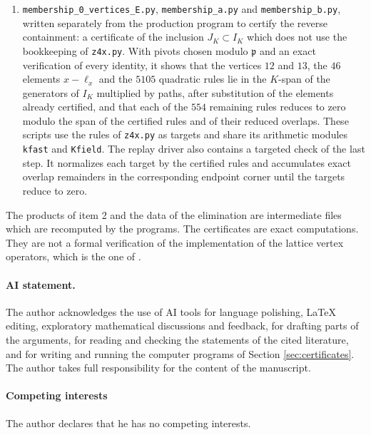 \documentclass[leqno]{article}
\numberwithin{equation}{section}
\begin{document}
\begin{enumerate}
\item \texttt{membership\_0\_vertices\_E.py}, \texttt{membership\_a.py} and \texttt{membership\_b.py}, written separately from the production program to certify the reverse containment: a certificate of the inclusion $J_K \subset I_K$ which does not use the bookkeeping of \texttt{z4x.py}. With pivots chosen modulo $\mathfrak p$ and an exact verification of every identity, it shows that the vertices $12$ and $13$, the $46$ elements $x - \ell_x$ and the $5105$ quadratic rules lie in the $K$-span of the generators of $I_K$ multiplied by paths, after substitution of the elements already certified, and that each of the $554$ remaining rules reduces to zero modulo the span of the certified rules and of their reduced overlaps. These scripts use the rules of \texttt{z4x.py} as targets and share its arithmetic modules \texttt{kfast} and \texttt{Kfield}. The replay driver also contains a targeted check of the last step. It normalizes each target by the certified rules and accumulates exact overlap remainders in the corresponding endpoint corner until the targets reduce to zero.
\end{enumerate}
The products of item 2 and the data of the elimination are intermediate files which are recomputed by the programs. The certificates are exact computations. They are not a formal verification of the implementation of the lattice vertex operators, which is the one of \cite{Arh26}.



\paragraph{AI statement.}
The author acknowledges the use of AI tools for language polishing, LaTeX editing, exploratory mathematical discussions and feedback, for drafting parts of the arguments, for reading and checking the statements of the cited literature, and for writing and running the computer programs of Section \ref{sec:certificates}. The author takes full responsibility for the content of the manuscript.

\paragraph{Competing interests} The author declares that he has no competing interests.
\end{document}
